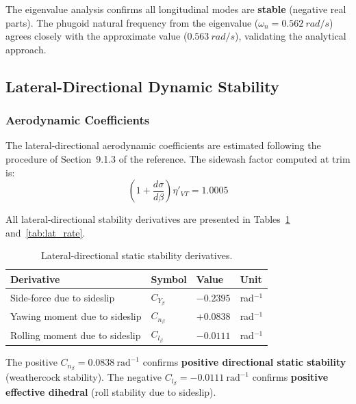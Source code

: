The eigenvalue analysis confirms all longitudinal modes are \textbf{stable} (negative real parts). The phugoid natural frequency from the eigenvalue ($\omega_n = \SI{0.562}{rad/s}$) agrees closely with the approximate value ($\SI{0.563}{rad/s}$), validating the analytical approach.

\subsection{Lateral-Directional Dynamic Stability}
\label{subsec:lat_stability}

\subsubsection{Aerodynamic Coefficients}

The lateral-directional aerodynamic coefficients are estimated following the procedure of Section~9.1.3 of the reference. The sidewash factor computed at trim is:
\begin{equation}
  \left(1 + \frac{d\sigma}{d\beta}\right)\eta'_{VT} = 1.0005
\end{equation}

All lateral-directional stability derivatives are presented in Tables~\ref{tab:lat_static} and~\ref{tab:lat_rate}.

\begin{table}[H]
  \centering
  \caption{Lateral-directional static stability derivatives.}
  \label{tab:lat_static}
  \begin{tabular}{llll}
    \toprule
    \textbf{Derivative} & \textbf{Symbol} & \textbf{Value} & \textbf{Unit} \\
    \midrule
    Side-force due to sideslip    & $C_{Y_\beta}$ & $-0.2395$ & rad$^{-1}$ \\
    Yawing moment due to sideslip & $C_{n_\beta}$ & $+0.0838$ & rad$^{-1}$ \\
    Rolling moment due to sideslip& $C_{l_\beta}$ & $-0.0111$ & rad$^{-1}$ \\
    \bottomrule
  \end{tabular}
\end{table}

\noindent The positive $C_{n_\beta} = 0.0838~\text{rad}^{-1}$ confirms \textbf{positive directional static stability} (weathercock stability). The negative $C_{l_\beta} = -0.0111~\text{rad}^{-1}$ confirms \textbf{positive effective dihedral} (roll stability due to sideslip).

